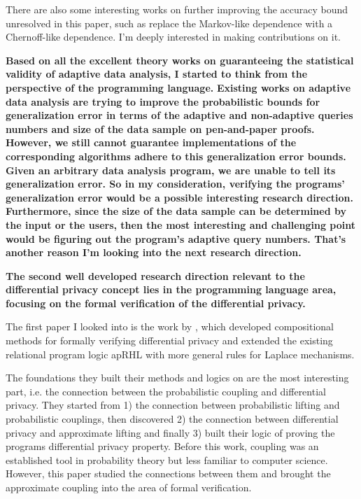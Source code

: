 \documentclass{article}
\begin{document}
There are also some interesting works on further improving the accuracy bound unresolved in this paper, such as replace the Markov-like dependence with a Chernoff-like dependence. I'm deeply interested in making contributions on it.

\textbf{Based on all the excellent theory works on guaranteeing the statistical validity of adaptive data analysis, I started to think from the perspective of the programming language.}
\textbf{Existing works on adaptive data analysis are trying to improve the probabilistic bounds for generalization error in terms of the adaptive and non-adaptive queries numbers and size of the data sample on pen-and-paper proofs.
However, we still cannot guarantee implementations of the corresponding algorithms adhere to this generalization error bounds.
Given an arbitrary data analysis program, we are unable to tell its generalization error. So in my consideration, verifying the programs' generalization error would be a possible interesting research direction. Furthermore, since the size of the data sample can be determined by the input or the users, then the most interesting and challenging point would be figuring out the program's adaptive query numbers. That's another reason I'm looking into the next research direction.}

\textbf{The second well developed research direction relevant to the differential privacy concept lies in the programming language area, focusing on the formal verification of the differential privacy.} 

The first paper I looked into is the work by \cite{barthe2016proving}, which developed compositional methods for formally verifying differential privacy and extended the existing relational program logic apRHL with more general rules for Laplace mechanisms.

The foundations they built their methods and logics on are the most interesting part, i.e. the connection between the probabilistic coupling and differential privacy.
They started from 1) the connection between probabilistic lifting and probabilistic couplings, then discovered 2) the connection between differential privacy and approximate lifting and finally 3) built their logic of proving the programs differential privacy property.
Before this work, coupling was an established tool in probability theory but less familiar to computer science. However, this paper studied the connections between them and brought the approximate coupling into the area of formal verification. 
\end{document}
